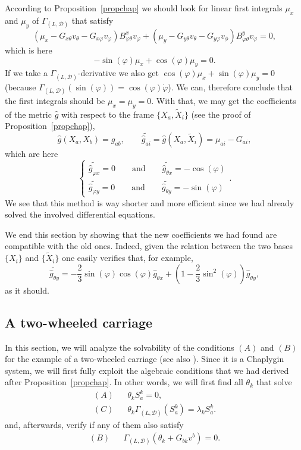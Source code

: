 \documentclass[11pt]{article}
\def\GLD{{\Gamma_{(L,\mathcal{D})}}}
\begin{document}
According to Proposition~\ref{propchap} we should look for linear first integrals $\mu_x$ and $\mu_y$  of $\Gamma_{(L,\mathcal{D})}$  that satisfy 
$$
 \left(\mu_x-G_{x \theta} v_\theta-G_{x \varphi} v_{\varphi}\right) B_{\varphi \theta}^x v_{\varphi} +\left(\mu_y-G_{y \theta} v_\theta-G_{y \varphi} v_\phi\right) B_{\varphi \theta}^y v_{\varphi}=0,
$$
which is here
$$
-\sin( \varphi) \mu_x+\cos (\varphi) \mu_y=0. 
$$
If we take a $\GLD$-derivative we also get $\cos( \varphi) \mu_x+\sin (\varphi) \mu_y=0$ (because $\GLD(\sin(\varphi)) = \cos(\varphi)\dot\varphi$). 
We can, therefore conclude that the first integrals should be $\mu_x=\mu_y=0$. With that, we may get the coefficients of the metric $\hat g$ with respect to the frame $\{X_a,{\tilde X}_i\}$ (see the proof of Proposition~\ref{propchap}),
\[
{\hat g}(X_a,X_b) =g_{ab}, \qquad \widetilde{{\hat g}_{ai}}= {\hat g}(X_a,{\tilde X}_i) =\mu_{ai}-G_{ai},
\]
which are here
\[    \begin{cases}
    \widetilde{\hat{g}_{\varphi x}}=0 \qquad \mbox{and}\qquad \widetilde{\hat{g}_{\theta x}}=-\cos( \varphi)\\
 \widetilde{\hat{g}_{\varphi y}}=0 \qquad \mbox{and}\qquad \widetilde{\hat{g}_{\theta y}}=-\sin( \varphi)
    \end{cases}.
		\]
We see that this method is way shorter and more efficient since we had already solved the involved differential equations. 

We end this section by showing that the new coefficients we had found are compatible with the old ones. Indeed, given the relation between the two bases $\{X_i\}$ and $\{{\tilde X}_i\}$ one easily verifies that, for example,  
\[
    \widetilde{\hat{g}_{\theta y}} =- \frac{2}{3}  \sin(\varphi) \cos(\varphi) \hat{g}_{\theta x}+\left(1- \frac{2}{3} \sin ^2 (\varphi)\right) \hat{g}_{\theta y}, 
\]
as it should.

\subsection{A two-wheeled carriage}  \label{carriagesec}

In this section, we will analyze the solvability of the conditions $(A)$ and $(B)$ for the example of a two-wheeled carriage (see also \cite{anhol,deL}). Since it is a Chaplygin system, we will first fully exploit the algebraic conditions that we had derived after  Proposition~\ref{propchap}. In other words, we will  first find all $\theta_k$ that solve 
\begin{eqnarray*}
    (A) && \theta_k S^k_a=0,\\
    (C) && \theta_k \GLD(S^k_a)= \lambda_k S^k_a.   
    \end{eqnarray*}  
and, afterwards, verify if any of them also satisfy 
\begin{eqnarray*}
    (B) &&
 \Gamma_{(L,\mathcal{D})}(\theta_k+G_{bk}v^b)=0.
\end{eqnarray*}
\end{document}
